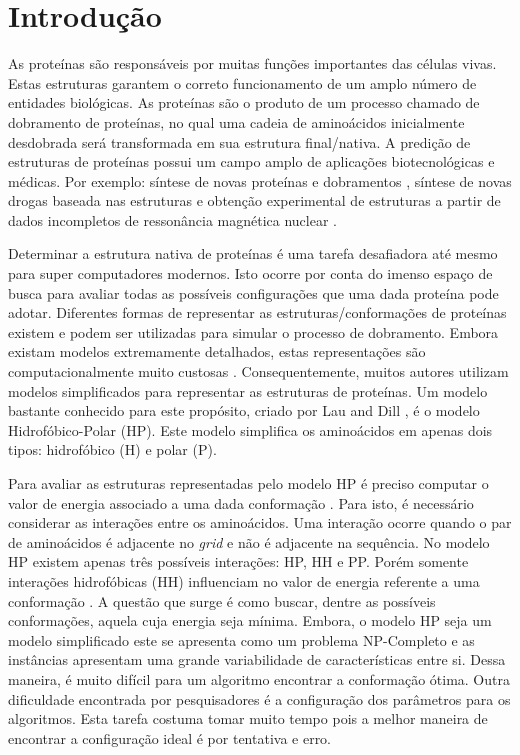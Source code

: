 \chapter{Introdução}

As proteínas são responsáveis por muitas funções importantes das células vivas. Estas estruturas garantem o correto funcionamento de um amplo número de entidades biológicas. As proteínas são o produto de um processo chamado de dobramento de proteínas, no qual uma cadeia de aminoácidos inicialmente desdobrada será transformada em sua estrutura final/nativa. A predição de estruturas de proteínas possui um campo amplo de aplicações biotecnológicas e médicas. Por exemplo: síntese de novas proteínas e dobramentos \cite{wang2012structural, rothlisberger2008kemp}, síntese de novas drogas baseada nas estruturas \cite{qian2004improvement, krieger2009improving}  e obtenção experimental de estruturas a partir de dados incompletos de ressonância magnética nuclear \cite{shen2009novo}.  

Determinar a estrutura nativa de proteínas é uma tarefa desafiadora até mesmo para super computadores modernos. Isto ocorre por conta do imenso espaço de busca para avaliar todas as possíveis configurações que uma dada proteína pode adotar. Diferentes formas de representar as estruturas/conformações de proteínas existem e podem ser utilizadas para simular o processo de dobramento. Embora existam modelos extremamente detalhados, estas representações são computacionalmente muito custosas \cite{benitez2015algoritmo, santana2008protein}. Consequentemente, muitos autores \cite{custodio2004investigation,hsu2003growth,lin2011protein,unger1993genetic,santana2008protein,custodio2014multiple, garza2012locality} utilizam modelos simplificados para representar as estruturas de proteínas. Um modelo bastante conhecido para este propósito, criado por Lau and Dill \cite{lau1989lattice}, é o modelo Hidrofóbico-Polar (HP). Este modelo simplifica os aminoácidos em apenas dois tipos: hidrofóbico (H) e polar (P). 

Para avaliar as estruturas representadas pelo modelo HP é preciso computar o valor de energia associado a uma dada conformação \cite{unger1993genetic}. Para isto, é necessário considerar as interações entre os aminoácidos. Uma interação ocorre quando o par de aminoácidos é adjacente no \textit{grid} e não é adjacente na sequência. No modelo HP existem apenas três possíveis interações: HP, HH e PP. Porém somente interações hidrofóbicas (HH) influenciam no valor de energia referente a uma conformação \cite{unger1993genetic}. A questão que surge é como buscar, dentre as possíveis conformações, aquela cuja energia seja mínima. Embora, o modelo HP seja um modelo simplificado este se apresenta como um problema NP-Completo e as instâncias apresentam uma grande variabilidade de características entre si. Dessa maneira, é muito difícil para um algoritmo encontrar a conformação ótima. Outra dificuldade encontrada por pesquisadores é a configuração dos parâmetros para os algoritmos. Esta tarefa costuma tomar muito tempo pois a melhor maneira de encontrar a configuração ideal é por tentativa e erro.

